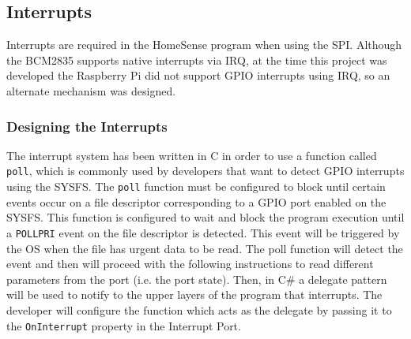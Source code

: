 \subsection{Interrupts}\label{SS:IOSharp-Interrupt}
Interrupts are required in the HomeSense program when using the \gls{SPI}. Although the \gls{BCM2835} supports native interrupts via \gls{IRQ}, at the time this project was developed the Raspberry Pi did not support GPIO interrupts using \gls{IRQ}, so an alternate mechanism was designed.

\subsubsection{Designing the Interrupts}\label{SSS:IOSharp-Interrupt-Design}
The interrupt system has been written in C in order to use a function called \verb!poll!, which is commonly used by developers that want to detect GPIO interrupts using the SYSFS. The \verb!poll! function must be configured to block until certain events occur on a file descriptor corresponding to a GPIO port enabled on the SYSFS. This function is configured to wait and block the program execution until a \verb!POLLPRI! event on the file descriptor is detected. This event will be triggered by the OS when the file has urgent data to be read. The poll function will detect the event and then will proceed with the following instructions to read different parameters from the port (i.e. the port state). Then, in C\# a delegate pattern will be used to notify to the upper layers of the program that interrupts. The developer will configure the function which acts as the delegate by passing it to the \verb!OnInterrupt! property in the Interrupt Port.

